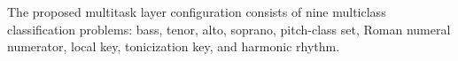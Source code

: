 
The proposed multitask layer configuration consists of nine
multiclass classification problems: bass, tenor, alto,
soprano, pitch-class set, Roman numeral numerator, local
key, tonicization key, and harmonic rhythm.
